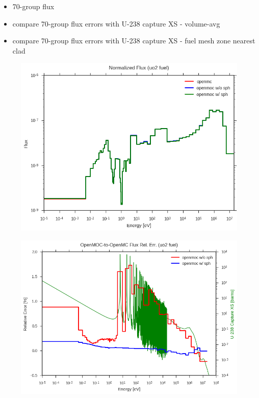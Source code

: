 \begin{itemize}
  \item 70-group flux
  \item compare 70-group flux errors with U-238 capture XS - volume-avg
  \item compare 70-group flux errors with U-238 capture XS - fuel mesh zone nearest clad
\end{itemize}

\begin{figure}[h!]
  \centering
  \includegraphics[width=0.9\linewidth]{figures/biases/pin-cell/flux-uo2-fuel}
  \caption{}
\label{fig:chap2-pin-flux}
\end{figure}

\begin{figure}[h!]
  \centering
  \includegraphics[width=0.9\linewidth]{figures/biases/pin-cell/rel-err-uo2-fuel}
  \caption{}
\label{fig:chap2-pin-flux}
\end{figure}


